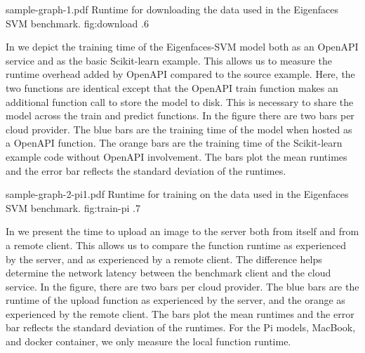 \OneFIGURE
    {sample-graph-1.pdf}
    {Runtime for downloading the data used in the Eigenfaces SVM benchmark.}
    {fig:download}
    {.6}
    
In  we depict the training time of the
Eigenfaces-SVM model both as an OpenAPI service and as the basic
Scikit-learn example. This allows us to measure the runtime overhead
added by OpenAPI compared to the source example. Here, the two
functions are identical except that the OpenAPI train function makes
an additional function call to store the model to disk. This is
necessary to share the model across the train and predict
functions. In the figure there are two bars per cloud provider. The
blue bars are the training time of the model when hosted as
a \Cloudmesh OpenAPI function. The orange bars are the training time
of the Scikit-learn example code without \Cloudmesh OpenAPI
involvement. The bars plot the mean runtimes and the error bar
reflects the standard deviation of the runtimes.



\OneFIGURE
    {sample-graph-2-pi1.pdf}
    {Runtime for training on the data used in the Eigenfaces SVM benchmark.}
    {fig:train-pi}
    {.7}
    


In  we present the time to upload an image to
the server both from itself and from a remote client. This allows us
to compare the function runtime as experienced by the server, and as
experienced by a remote client. The difference helps determine the
network latency between the benchmark client and the cloud service. In
the figure, there are two bars per cloud provider. The blue bars are
the runtime of the upload function as experienced by the server, and
the orange as experienced by the remote client. The bars plot the mean
runtimes and the error bar reflects the standard deviation of the
runtimes. For the Pi models, MacBook, and docker container, we only
measure the local function runtime.


